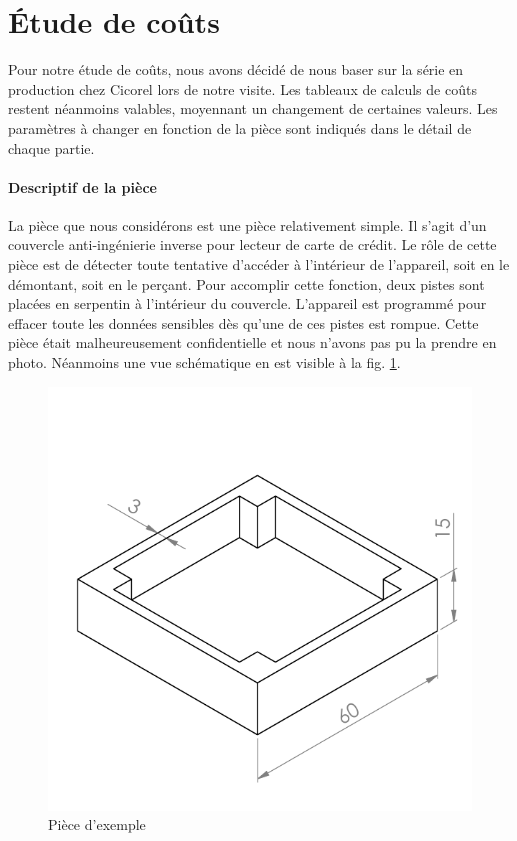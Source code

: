 \section{Étude de coûts}
Pour notre étude de coûts, nous avons décidé de nous baser sur la série en production chez Cicorel lors de notre visite.
Les tableaux de calculs de coûts restent néanmoins valables, moyennant un changement de certaines valeurs.
Les paramètres à changer en fonction de la pièce sont indiqués dans le détail de chaque partie.


\paragraph{Descriptif de la pièce}
La pièce que nous considérons est une pièce relativement simple.
Il s'agit d'un couvercle anti-ingénierie inverse pour lecteur de carte de crédit.
Le rôle de cette pièce est de détecter toute tentative d'accéder à l'intérieur de l'appareil, soit en le démontant, soit en le perçant.
Pour accomplir cette fonction, deux pistes sont placées en serpentin à l'intérieur du couvercle.
L'appareil est programmé pour effacer toute les données sensibles dès qu'une de ces pistes est rompue.
Cette pièce était malheureusement confidentielle et nous n'avons pas pu la prendre en photo.
Néanmoins une vue schématique en est visible à la fig. \ref{fig:example-part}.

\begin{figure}[h]
    \begin{center}
        \includegraphics[width=\textwidth]{images/example_part/example_mid}
        \caption{Pièce d'exemple}\label{fig:example-part}
    \end{center}
\end{figure}
